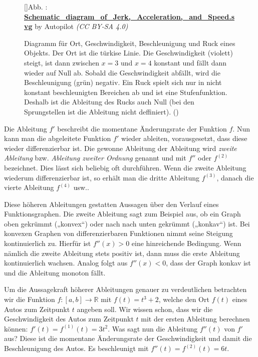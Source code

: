 \documentclass[fontsize=9pt,
               parskip=half-,
               DIV=14,
               listof=chapterentry,
               tocflat]{scrbook}
\newcounter{imagelabel}
\begin{document}
\begin{figure}[h]
\vspace{\baselineskip}
[]{Abb. : \protect\href{https://commons.wikimedia.org/wiki/File:Schematic_diagram_of_Jerk,_Acceleration,_and_Speed.svg}{\textbf{Schematic\allowbreak\_diagram\allowbreak\_of\allowbreak\_Jerk,\allowbreak\_Acceleration,\allowbreak\_and\allowbreak\_Speed.svg}} by Autopilot \textit{(CC BY-SA 4.0)}}\centering
{}
\caption*{Diagramm für Ort, Geschwindigkeit, Beschleunigung und Ruck eines Objekts. Der Ort ist die türkise Linie. Die Geschwindigkeit (violett) steigt, ist dann zwischen $x=3$ und $x=4$ konstant und fällt dann wieder auf Null ab. Sobald die Geschwindigkeit abfällt, wird die Beschleunigung (grün) negativ. Ein Ruck spielt sich nur in nicht konstant beschleunigten Bereichen ab und ist eine Stufenfunktion. Deshalb ist die Ableitung des Rucks auch Null (bei den Sprungstellen ist die Ableitung nicht deffiniert). ()}
\end{figure}
Die Ableitung $f'$ beschreibt die momentane Änderungsrate der Funktion $f$. Nun kann man die abgeleitete Funktion $f'$ wieder ableiten, vorausgesetzt, dass diese wieder differenzierbar ist. Die gewonne Ableitung der Ableitung wird \emph{zweite Ableitung} bzw. \emph{Ableitung zweiter Ordnung} genannt und mit $f''$ oder $f^{(2)}$ bezeichnet. Dies lässt sich beliebig oft durchführen. Wenn die zweite Ableitung wiederum differenzierbar ist, so erhält man die dritte Ableitung $f^{(3)}$, danach die vierte Ableitung $f^{(4)}$ usw..

Diese höheren Ableitungen gestatten Aussagen über den Verlauf eines Funktionsgraphen. Die zweite Ableitung sagt zum Beispiel aus, ob ein Graph oben gekrümmt („konvex“) oder nach nach unten gekrümmt („konkav“) ist. Bei konvexen Graphen von differenzierbaren Funktionen nimmt seine Steigung kontinuierlich zu. Hierfür ist $f''(x)>0$ eine hinreichende Bedingung. Wenn nämlich die zweite Ableitung stets positiv ist, dann muss die erste Ableitung kontinuierlich wachsen. Analog folgt aus $f''(x)<0$, dass der Graph konkav ist und die Ableitung monoton fällt.

Um die Aussagekraft höherer Ableitungen genauer zu verdeutlichen betrachten wir die Funktion $f:[a,b]\to \mathbb {R} $ mit $f(t)=t^{3}+2$, welche den Ort $f(t)$ eines Autos zum Zeitpunkt $t$ angeben soll. Wir wissen schon, dass wir die Geschwindigkeit des Autos zum Zeitpunkt $t$ mit der ersten Ableitung berechnen können: $f'(t)=f^{(1)}(t)=3t^{2}$. Was sagt nun die Ableitung $f''(t)$ von $f'$ aus? Diese ist die momentane Änderungsrate der Geschwindigkeit und damit die Beschleunigung des Autos. Es beschleunigt mit $f''(t)=f^{(2)}(t)=6t$.
\end{document}
